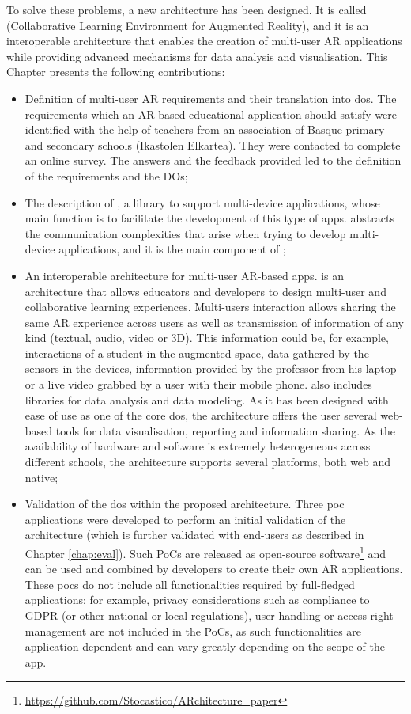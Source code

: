 To solve these problems, a new architecture has been designed. It is called \arch{} (Collaborative Learning Environment for Augmented Reality), and it is an interoperable architecture that enables the creation of multi-user AR applications while providing advanced mechanisms for data analysis and visualisation. This Chapter presents the following contributions:
\begin{itemize}
    \item Definition of multi-user AR requirements and their translation into \glspl{do}. The requirements which an AR-based educational application should satisfy were identified with the help of teachers from an association of Basque primary and secondary schools (Ikastolen Elkartea). They were contacted to complete an online survey. The answers and the feedback provided led to the definition of the requirements and the DOs;
    \item The description of \textit{\ork{}}, a library to support multi-device applications, whose main function is to facilitate the development of this type of apps. \textit{\ork{}} abstracts the communication complexities that arise when trying to develop multi-device applications, and it is the main component of \arch{};
    \item An interoperable architecture for multi-user AR-based apps. \arch{} is an architecture that allows educators and developers to design multi-user and collaborative learning experiences. Multi-users interaction allows sharing the same AR experience across users as well as transmission of information of any kind (textual, audio, video or 3D). This information could be, for example, interactions of a student in the augmented space, data gathered by the sensors in the devices, information provided by the professor from his laptop or a live video grabbed by a user with their mobile phone. \arch{} also includes libraries for data analysis and data modeling. As it has been designed with ease of use as one of the core \glspl{do}, the architecture offers the user several web-based tools for data visualisation, reporting and information sharing. As the availability of hardware and software is extremely heterogeneous across different schools, the architecture supports several platforms, both web and native;
    \item Validation of the \glspl{do} within the proposed architecture. Three \gls{poc} applications were developed to perform an initial validation of the architecture (which is further validated with end-users as described in Chapter \ref{chap:eval}). Such PoCs are released as open-source software\footnote{\url{https://github.com/Stocastico/ARchitecture_paper}} and can be used and combined by developers to create their own AR applications. These \glspl{poc} do not include all functionalities required by full-fledged applications: for example, privacy considerations such as compliance to GDPR (or other national or local regulations), user handling or access right management are not included in the PoCs, as such functionalities are application dependent and can vary greatly depending on the scope of the app.
\end{itemize}

